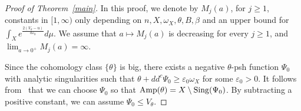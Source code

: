 \documentclass[a4paper,11pt]{amsart}
\numberwithin{equation}{section}
\theoremstyle{definition}
\begin{document}
\begin{proof}[Proof of Theorem~\ref{main}] 
	In this proof, we denote by	$M_j(a)$, for $j\geq 1$, 
    constants in $[1, \infty)$ only depending on $n, X, \omega_X, \theta, B, \beta$ and an upper bound for $\int_X e^{\frac{2(V_\theta-u)}{a\varepsilon_0}} d\mu$. We assume that $a\mapsto M_j(a)$ is decreasing for every
	$j\geq 1$, and $\lim_{a\to 0^+}M_{j}(a)=\infty$.

\smallskip
Since the cohomology class $\{\theta\}$ is big, there exists a negative 
$\theta$-psh function $\Psi_0$ with analytic
singularities such that $\theta +dd^c\Psi_0\geq\varepsilon_0\omega_X$
for some $\varepsilon_0>0$. 
It follows from~\cite{boucksom2004divisorial} that we can choose $\Psi_0$ so that ${\rm Amp}(\theta)=X\setminus {\rm Sing}(\Psi_0)$. By subtracting a positive constant, we can assume $\Psi_0\leq V_\theta$.


\end{proof}
\end{document}

